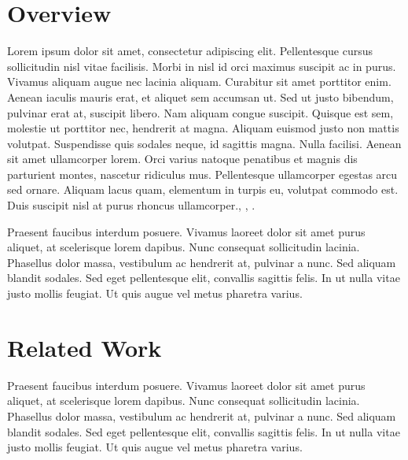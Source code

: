 \section{Overview} \label{sec:1.1}
\vspace{-0.5cm}
\noindent Lorem ipsum dolor sit amet, consectetur adipiscing elit. Pellentesque cursus sollicitudin nisl vitae facilisis. Morbi in nisl id orci maximus suscipit ac in purus. Vivamus aliquam augue nec lacinia aliquam. Curabitur sit amet porttitor enim. Aenean iaculis mauris erat, et aliquet sem accumsan ut. Sed ut justo bibendum, pulvinar erat at, suscipit libero. Nam aliquam congue suscipit. Quisque est sem, molestie ut porttitor nec, hendrerit at magna. Aliquam euismod justo non mattis volutpat. Suspendisse quis sodales neque, id sagittis magna. Nulla facilisi. Aenean sit amet ullamcorper lorem. Orci varius natoque penatibus et magnis dis parturient montes, nascetur ridiculus mus. Pellentesque ullamcorper egestas arcu sed ornare. Aliquam lacus quam, elementum in turpis eu, volutpat commodo est. Duis suscipit nisl at purus rhoncus ullamcorper., \cite{Haykins}, \cite{Hayes}.

\vspace{-0.5cm}
\par
\noindent Praesent faucibus interdum posuere. Vivamus laoreet dolor sit amet purus aliquet, at scelerisque lorem dapibus. Nunc consequat sollicitudin lacinia. Phasellus dolor massa, vestibulum ac hendrerit at, pulvinar a nunc. Sed aliquam blandit sodales. Sed eget pellentesque elit, convallis sagittis felis. In ut nulla vitae justo mollis feugiat. Ut quis augue vel metus pharetra varius.

\vspace{-0.3cm}
\section{Related Work}\label{sec:1.2}
\vspace{-0.6cm}
\noindent Praesent faucibus interdum posuere. Vivamus laoreet dolor sit amet purus aliquet, at scelerisque lorem dapibus. Nunc consequat sollicitudin lacinia. Phasellus dolor massa, vestibulum ac hendrerit at, pulvinar a nunc. Sed aliquam blandit sodales. Sed eget pellentesque elit, convallis sagittis felis. In ut nulla vitae justo mollis feugiat. Ut quis augue vel metus pharetra varius.



\vspace{-0.3cm}
